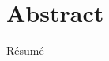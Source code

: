 %
\chapter*{Abstract}
\label{sec:abstract}
\vspace*{-10mm}



\vspace*{20mm}

{Résumé}
\label{sec:abstract-fr}\\


